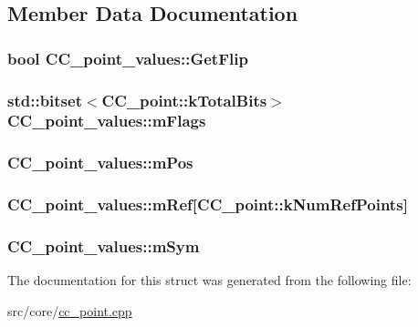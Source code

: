 \subsection{Member Data Documentation}
\hypertarget{a00035_adbd7c0d6e0412fc07d964551bb2ad9a1}{
\subsubsection[{Get\-Flip}]{\setlength{\rightskip}{0pt plus 5cm}bool C\-C\-\_\-point\-\_\-values\-::\-Get\-Flip}}\label{a00035_adbd7c0d6e0412fc07d964551bb2ad9a1}
\hypertarget{a00035_aaba0cdfb77d6416849ad4cc44c49acb6}{
\subsubsection[{m\-Flags}]{\setlength{\rightskip}{0pt plus 5cm}std\-::bitset$<${\bf C\-C\-\_\-point\-::k\-Total\-Bits}$>$ C\-C\-\_\-point\-\_\-values\-::m\-Flags}}\label{a00035_aaba0cdfb77d6416849ad4cc44c49acb6}
\hypertarget{a00035_afd2d71183219ead4687efa86e8fa6904}{
\subsubsection[{m\-Pos}]{ C\-C\-\_\-point\-\_\-values\-::m\-Pos}}\label{a00035_afd2d71183219ead4687efa86e8fa6904}
\hypertarget{a00035_ab8797ebb0797a22c1d90091265c822f2}{
\subsubsection[{m\-Ref}]{ C\-C\-\_\-point\-\_\-values\-::m\-Ref\mbox{[}{\bf C\-C\-\_\-point\-::k\-Num\-Ref\-Points}\mbox{]}}}\label{a00035_ab8797ebb0797a22c1d90091265c822f2}
\hypertarget{a00035_aecc6f13cb613498e3c307a4be4353075}{
\subsubsection[{m\-Sym}]{ C\-C\-\_\-point\-\_\-values\-::m\-Sym}}\label{a00035_aecc6f13cb613498e3c307a4be4353075}


The documentation for this struct was generated from the following file\-:\begin{DoxyCompactItemize}
\item 
src/core/\hyperlink{a00207}{cc\-\_\-point.\-cpp}\end{DoxyCompactItemize}
